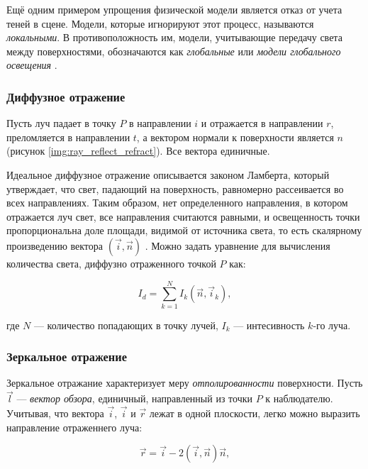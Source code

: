 Ещё одним примером упрощения физической модели является отказ от учета теней в сцене. Модели, которые игнорируют этот процесс, называются \textit{локальными}. В противоположность им, модели, учитывающие передачу света между поверхностями, обозначаются как \textit{глобальные} или \textit{модели глобального освещения} \cite{levedeb_gi_history}.

\subsubsection*{Диффузное отражение}

Пусть луч падает в точку $P$ в направлении $i$ и отражается в направлении $r$, преломляется в направлении $t$, а вектором нормали к поверхности является $n$ (рисунок \ref{img:ray_reflect_refract}). Все вектора единичные.


Идеальное диффузное отражение описывается законом Ламберта, который утверждает, что свет, падающий на поверхность, равномерно рассеивается во всех направлениях. Таким образом, нет определенного направления, в котором отражается луч свет, все направления считаются равными, и освещенность точки пропорциональна доле площади, видимой от источника света, то есть скалярному произведению вектора $( \vec{i}, \vec{n} )$ \cite{boreskov_cg}. Можно задать уравнение для вычисления количества света, диффузно отраженного точкой $P$ как:

\begin{equation}
	\label{eq:diffuse_light}
	I_d = \sum_{k=1}^{N} I_k \left(\vec{n}, \vec{i}_k\right),
\end{equation}

где $N$ --- количество попадающих в точку лучей, $I_k$ --- интесивность $k$-го луча.

\subsubsection*{Зеркальное отражение}

Зеркальное отражание характеризует меру \textit{отполированности} поверхности. Пусть $\vec{l}$ --- \textit{вектор обзора}, единичный, направленный из точки $P$ к наблюдателю. Учитывая, что вектора $\vec{i}$, $\vec{i}$ и $\vec{r}$ лежат в одной плоскости, легко можно выразить направление отраженнего луча:

\begin{equation}
	\label{eq:reflected_ray}
	\vec{r} = \vec{i} - 2(\vec{i},\vec{n})\vec{n},
\end{equation}

